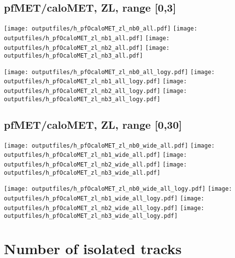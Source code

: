\documentclass[11pt]{article}
\begin{document}

    \subsection{ pfMET/caloMET, ZL, range [0,3]}

    \noindent
     \texttt{[image: outputfiles/h\_pfOcaloMET\_zl\_nb0\_all.pdf]}
     \texttt{[image: outputfiles/h\_pfOcaloMET\_zl\_nb1\_all.pdf]}
     \texttt{[image: outputfiles/h\_pfOcaloMET\_zl\_nb2\_all.pdf]}
     \texttt{[image: outputfiles/h\_pfOcaloMET\_zl\_nb3\_all.pdf]}

    \noindent
     \texttt{[image: outputfiles/h\_pfOcaloMET\_zl\_nb0\_all\_logy.pdf]}
     \texttt{[image: outputfiles/h\_pfOcaloMET\_zl\_nb1\_all\_logy.pdf]}
     \texttt{[image: outputfiles/h\_pfOcaloMET\_zl\_nb2\_all\_logy.pdf]}
     \texttt{[image: outputfiles/h\_pfOcaloMET\_zl\_nb3\_all\_logy.pdf]}

    \clearpage



    \subsection{ pfMET/caloMET, ZL, range [0,30]}

    \noindent
     \texttt{[image: outputfiles/h\_pfOcaloMET\_zl\_nb0\_wide\_all.pdf]}
     \texttt{[image: outputfiles/h\_pfOcaloMET\_zl\_nb1\_wide\_all.pdf]}
     \texttt{[image: outputfiles/h\_pfOcaloMET\_zl\_nb2\_wide\_all.pdf]}
     \texttt{[image: outputfiles/h\_pfOcaloMET\_zl\_nb3\_wide\_all.pdf]}

    \noindent
     \texttt{[image: outputfiles/h\_pfOcaloMET\_zl\_nb0\_wide\_all\_logy.pdf]}
     \texttt{[image: outputfiles/h\_pfOcaloMET\_zl\_nb1\_wide\_all\_logy.pdf]}
     \texttt{[image: outputfiles/h\_pfOcaloMET\_zl\_nb2\_wide\_all\_logy.pdf]}
     \texttt{[image: outputfiles/h\_pfOcaloMET\_zl\_nb3\_wide\_all\_logy.pdf]}

    \clearpage


  \section{ Number of isolated tracks }
\end{document}
